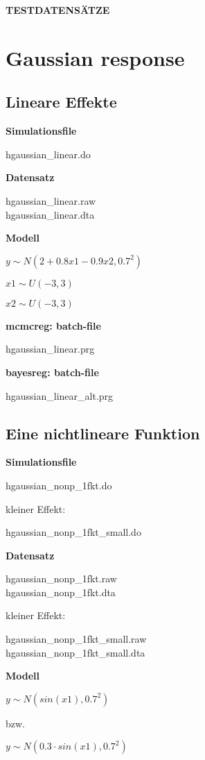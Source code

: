 \documentclass[10pt,a4paper]{article}
\begin{document}
{\bf \Huge TESTDATENS\"{A}TZE}

\tableofcontents

\section{Gaussian response}

\subsection{Lineare Effekte}

{\bf Simulationsfile}

hgaussian\_linear.do

{\bf Datensatz}

hgaussian\_linear.raw \\[0.2cm]
hgaussian\_linear.dta


{\bf Modell}


$y  \sim N(2+0.8 x1 - 0.9 x2 ,0.7^2)$

$x1 \sim U(-3,3)$

$x2 \sim U(-3,3)$

{\bf mcmcreg: batch-file}

hgaussian\_linear.prg

{\bf bayesreg: batch-file}

hgaussian\_linear\_alt.prg



\subsection{Eine nichtlineare Funktion}

{\bf Simulationsfile}

hgaussian\_nonp\_1fkt.do

kleiner Effekt:

hgaussian\_nonp\_1fkt\_small.do

{\bf Datensatz}

hgaussian\_nonp\_1fkt.raw \\[0.2cm]
hgaussian\_nonp\_1fkt.dta

kleiner Effekt:

hgaussian\_nonp\_1fkt\_small.raw \\[0.2cm]
hgaussian\_nonp\_1fkt\_small.dta


{\bf Modell}

$y  \sim N(sin(x1),0.7^2)$

bzw.

$y  \sim N(0.3 \cdot sin(x1),0.7^2)$
\end{document}
